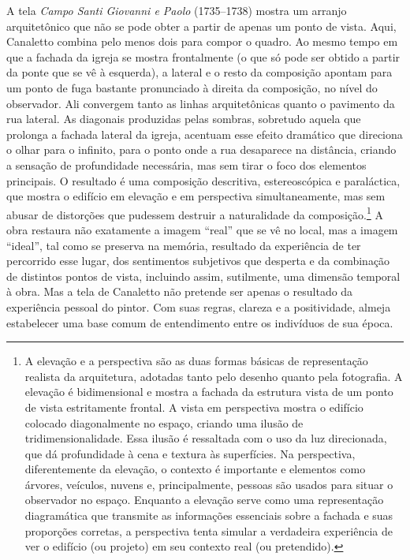 A tela \emph{Campo Santi Giovanni e Paolo} (1735--1738) mostra um arranjo
arquitetônico que não se pode obter a partir de apenas um ponto de
vista. Aqui, Canaletto combina pelo menos dois para compor o quadro. Ao
mesmo tempo em que a fachada da igreja se mostra frontalmente (o que só
pode ser obtido a partir da ponte que se vê à esquerda), a lateral e o
resto da composição apontam para um ponto de fuga bastante pronunciado à
direita da composição, no nível do observador. Ali convergem tanto as
linhas arquitetônicas quanto o pavimento da rua lateral. As diagonais
produzidas pelas sombras, sobretudo aquela que prolonga a fachada
lateral da igreja, acentuam esse efeito dramático que direciona o olhar
para o infinito, para o ponto onde a rua desaparece na distância,
criando a sensação de profundidade necessária, mas sem tirar o foco dos
elementos principais. O resultado é uma composição descritiva,
estereoscópica e paraláctica, que mostra o edifício em elevação e em
perspectiva simultaneamente, mas sem abusar de distorções que pudessem
destruir a naturalidade da composição.\footnote{A elevação e a
  perspectiva são as duas formas básicas de representação realista da
  arquitetura, adotadas tanto pelo desenho quanto pela fotografia. A
  elevação é bidimensional e mostra a fachada da estrutura vista de um
  ponto de vista estritamente frontal. A vista em perspectiva mostra o
  edifício colocado diagonalmente no espaço, criando uma ilusão de
  tridimensionalidade. Essa ilusão é ressaltada com o uso da luz
  direcionada, que dá profundidade à cena e textura às superfícies. Na
  perspectiva, diferentemente da elevação, o contexto é importante e
  elementos como árvores, veículos, nuvens e, principalmente, pessoas
  são usados para situar o observador no espaço. Enquanto a elevação
  serve como uma representação diagramática que transmite as informações
  essenciais sobre a fachada e suas proporções corretas, a perspectiva
  tenta simular a verdadeira experiência de ver o edifício (ou projeto)
  em seu contexto real (ou pretendido).} A obra restaura não exatamente
a imagem ``real'' que se vê no local, mas a imagem ``ideal'', tal como
se preserva na memória, resultado da experiência de ter percorrido esse
lugar, dos sentimentos subjetivos que desperta e da combinação de
distintos pontos de vista, incluindo assim, sutilmente, uma dimensão
temporal à obra. Mas a tela de Canaletto não pretende ser apenas o
resultado da experiência pessoal do pintor. Com suas regras, clareza e a
positividade, almeja estabelecer uma base comum de entendimento entre os
indivíduos de sua época.

